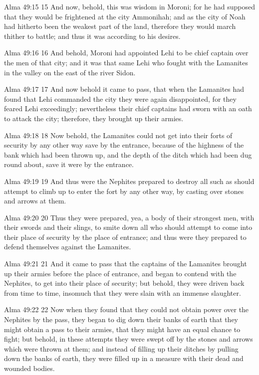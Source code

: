 Alma 49:15
 15 And now, behold, this was wisdom in Moroni; for he had
supposed that they would be frightened at the city Ammonihah; and
as the city of Noah had hitherto been the weakest part of the
land, therefore they would march thither to battle; and thus it
was according to his desires.

Alma 49:16
 16 And behold, Moroni had appointed Lehi to be chief captain
over the men of that city; and it was that same Lehi who fought
with the Lamanites in the valley on the east of the river Sidon.

Alma 49:17
 17 And now behold it came to pass, that when the Lamanites had
found that Lehi commanded the city they were again disappointed,
for they feared Lehi exceedingly; nevertheless their chief
captains had sworn with an oath to attack the city; therefore,
they brought up their armies.

Alma 49:18
 18 Now behold, the Lamanites could not get into their forts of
security by any other way save by the entrance, because of the
highness of the bank which had been thrown up, and the depth of
the ditch which had been dug round about, save it were by the
entrance.

Alma 49:19
 19 And thus were the Nephites prepared to destroy all such as
should attempt to climb up to enter the fort by any other way, by
casting over stones and arrows at them.

Alma 49:20
 20 Thus they were prepared, yea, a body of their strongest men,
with their swords and their slings, to smite down all who should
attempt to come into their place of security by the place of
entrance; and thus were they prepared to defend themselves
against the Lamanites.

Alma 49:21
 21 And it came to pass that the captains of the Lamanites
brought up their armies before the place of entrance, and began
to contend with the Nephites, to get into their place of
security; but behold, they were driven back from time to time,
insomuch that they were slain with an immense slaughter.

Alma 49:22
 22 Now when they found that they could not obtain power over the
Nephites by the pass, they began to dig down their banks of earth
that they might obtain a pass to their armies, that they might
have an equal chance to fight; but behold, in these attempts they
were swept off by the stones and arrows which were thrown at
them; and instead of filling up their ditches by pulling down the
banks of earth, they were filled up in a measure with their dead
and wounded bodies.

